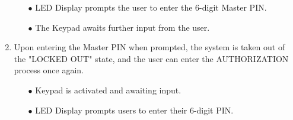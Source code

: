 \documentclass{article}
\begin{document}
\begin{enumerate}
\begin{enumerate}
        \item[$\bullet$] LED Display prompts the user to enter the 6-digit Master PIN.
        \item[$\bullet$] The Keypad awaits further input from the user.
    \end{enumerate}
    \item Upon entering the Master PIN when prompted, the system is taken out of the "LOCKED OUT" state, and the user can enter the AUTHORIZATION process once again.
    \begin{enumerate}
        \item[$\bullet$] Keypad is activated and awaiting input.
        \item[$\bullet$] LED Display prompts users to enter their 6-digit PIN.
    \end{enumerate}    
\end{enumerate}

\newpage

\printbibliography

{\parindent0pt}
\end{document}
